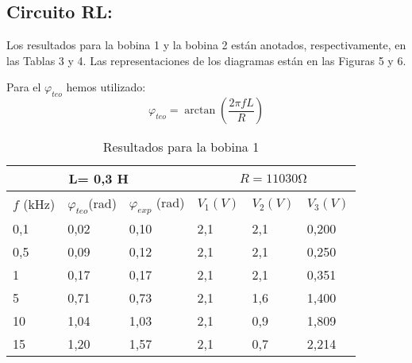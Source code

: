 \documentclass[a4paper,12pt,spanish]{article}
\begin{document}
\subsection*{Circuito RL:}

Los resultados para la bobina 1 y la bobina 2 están anotados, respectivamente, en las Tablas 3 y 4.
Las representaciones de los diagramas están en las Figuras 5 y 6.

Para el $\varphi_{teo}$ hemos utilizado:
\[ \varphi_{teo} = \arctan\left(\frac{2\pi f L}{R}\right) \]


\begin{table}[H]
	\centering
	\begin{tabular}{|lll|lll|}
		\hline
		\multicolumn{3}{|c|}{L= 0,3 H}                                                                       & \multicolumn{3}{c|}{$R = 11030 \si{\ohm}$}                              \\ \hline
		\multicolumn{1}{|l|}{$f$ (kHz)} & \multicolumn{1}{l|}{$\varphi_{teo}$(rad)} & $\varphi_{exp}$ (rad) & \multicolumn{1}{l|}{$V_1 (\si{V})$}  & \multicolumn{1}{l|}{$V_2 (\si{V})$}    & $V_3 (\si{V})$ \\ \hline
		\multicolumn{1}{|l|}{0,1}     & \multicolumn{1}{l|}{0,02}                 & 0,10                     & \multicolumn{1}{l|}{2,1} & \multicolumn{1}{l|}{2,1} & 0,200         \\ \hline
		\multicolumn{1}{|l|}{0,5}     & \multicolumn{1}{l|}{0,09}                 & 0,12                     & \multicolumn{1}{l|}{2,1} & \multicolumn{1}{l|}{2,1} & 0,250         \\ \hline
		\multicolumn{1}{|l|}{1}       & \multicolumn{1}{l|}{0,17}                 & 0,17                     & \multicolumn{1}{l|}{2,1} & \multicolumn{1}{l|}{2,1} & 0,351         \\ \hline
		\multicolumn{1}{|l|}{5}       & \multicolumn{1}{l|}{0,71}                 & 0,73                     & \multicolumn{1}{l|}{2,1} & \multicolumn{1}{l|}{1,6} & 1,400       \\ \hline
		\multicolumn{1}{|l|}{10}      & \multicolumn{1}{l|}{1,04}                 & 1,03                     & \multicolumn{1}{l|}{2,1} & \multicolumn{1}{l|}{0,9} & 1,809       \\ \hline
		\multicolumn{1}{|l|}{15}      & \multicolumn{1}{l|}{1,20}                 & 1,57                     & \multicolumn{1}{l|}{2,1} & \multicolumn{1}{l|}{0,7} & 2,214       \\ \hline
	\end{tabular}
	\caption{Resultados para la bobina 1}
	\label{tab:my-table}
\end{table}
\end{document}
